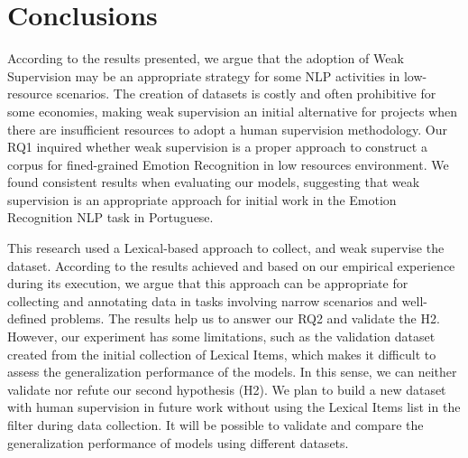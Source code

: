 \documentclass[12pt]{article}
\begin{document}
\section{Conclusions}

According to the results presented, we argue that the adoption of Weak Supervision may be an appropriate strategy for some NLP activities in low-resource scenarios. The creation of datasets is costly and often prohibitive for some economies, making weak supervision an initial alternative for projects when there are insufficient resources to adopt a human supervision methodology. Our RQ1 inquired whether weak supervision is a proper approach to construct a corpus for fined-grained Emotion Recognition in low resources environment. We found consistent results when evaluating our models, suggesting that weak supervision is an appropriate approach for initial work in the Emotion Recognition NLP task in Portuguese.

This research used a Lexical-based approach to collect, and weak supervise the dataset. According to the results achieved and based on our empirical experience during its execution, we argue that this approach can be appropriate for collecting and annotating data in tasks involving narrow scenarios and well-defined problems. The results help us to answer our RQ2 and validate the H2. However, our experiment has some limitations, such as the validation dataset created from the initial collection of Lexical Items, which makes it difficult to assess the generalization performance of the models. In this sense, we can neither validate nor refute our second hypothesis (H2). We plan to build a new dataset with human supervision in future work without using the Lexical Items list in the filter during data collection. It will be possible to validate and compare the generalization performance of models using different datasets.




\end{document}
